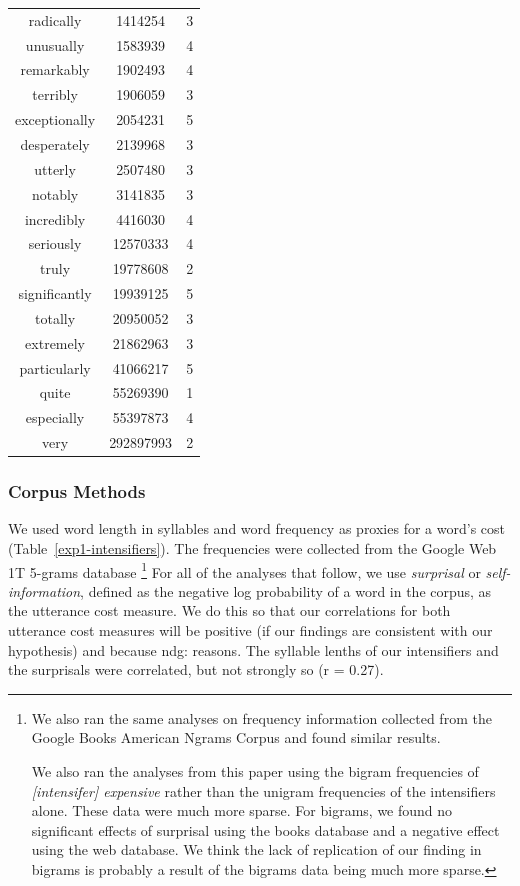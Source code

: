 \documentclass[10pt,letterpaper]{article}
\newcommand{\w}[1]{\emph{#1}}
\newcommand{\todo}[1]{{\color{red}#1}}
\begin{document}
\begin{table}[ht]
\begin{center}
\begin{tabular}{ccc}
    radically & 1414254 & 3 \\
    unusually & 1583939 & 4 \\
    remarkably & 1902493 & 4 \\
    terribly & 1906059 & 3 \\
    exceptionally & 2054231 & 5 \\
    desperately & 2139968 & 3 \\
    utterly & 2507480 & 3 \\
    notably & 3141835 & 3 \\
    incredibly & 4416030 & 4 \\
    seriously & 12570333 & 4 \\
    truly & 19778608 & 2 \\
    significantly & 19939125 & 5 \\
    totally & 20950052 & 3 \\
    extremely & 21862963 & 3 \\
    particularly & 41066217 & 5 \\
    quite & 55269390 & 1 \\
    especially & 55397873 & 4 \\
    very & 292897993 & 2
  \end{tabular}
 \end{center}
\end{table}

\subsubsection{Corpus Methods}

We used word length in syllables and word frequency as proxies for a word's cost (Table~\ref{exp1-intensifiers}).
The frequencies were collected from the Google Web 1T 5-grams database \cite{web1t5gram}\footnote{
We also ran the same analyses on frequency information collected from the Google Books American Ngrams Corpus \cite{books2011} and found similar results.

We also ran the analyses from this paper using the bigram frequencies of \w{[intensifer] expensive} rather than the unigram frequencies of the intensifiers alone. These data were much more sparse. For bigrams, we found no significant effects of surprisal using the books database and a negative effect using the web database. We think the lack of replication of our finding in bigrams is probably a result of the bigrams data being much more sparse.
}
For all of the analyses that follow, we use \w{surprisal} or \w{self-information}, defined as the negative log probability of a word in the corpus, as the utterance cost measure. We do this so that our correlations for both utterance cost measures will be positive (if our findings are consistent with our hypothesis) and because \todo{ndg: reasons}. The syllable lenths of our intensifiers and the surprisals %
were correlated, but not strongly so (r = 0.27).
\end{document}
